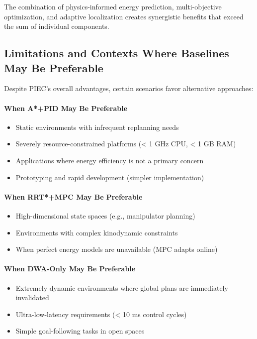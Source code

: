 The combination of physics-informed energy prediction, multi-objective optimization, and adaptive localization creates synergistic benefits that exceed the sum of individual components.

\subsection{Limitations and Contexts Where Baselines May Be Preferable}

Despite PIEC's overall advantages, certain scenarios favor alternative approaches:

\paragraph{When A*+PID May Be Preferable}
\begin{itemize}
    \item Static environments with infrequent replanning needs
    \item Severely resource-constrained platforms (< 1 GHz CPU, < 1 GB RAM)
    \item Applications where energy efficiency is not a primary concern
    \item Prototyping and rapid development (simpler implementation)
\end{itemize}

\paragraph{When RRT*+MPC May Be Preferable}
\begin{itemize}
    \item High-dimensional state spaces (e.g., manipulator planning)
    \item Environments with complex kinodynamic constraints
    \item When perfect energy models are unavailable (MPC adapts online)
\end{itemize}

\paragraph{When DWA-Only May Be Preferable}
\begin{itemize}
    \item Extremely dynamic environments where global plans are immediately invalidated
    \item Ultra-low-latency requirements (< 10 ms control cycles)
    \item Simple goal-following tasks in open spaces
\end{itemize}

